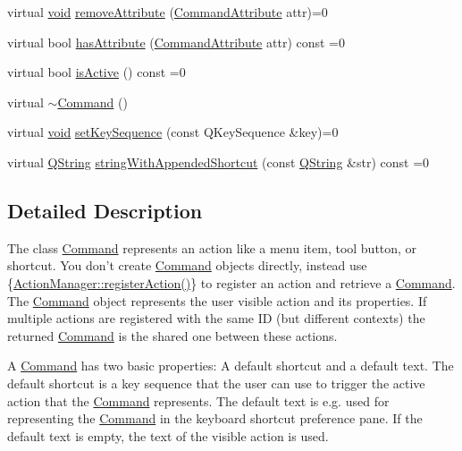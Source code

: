 \begin{DoxyCompactItemize}
\item 
virtual \hyperlink{group___u_a_v_objects_plugin_ga444cf2ff3f0ecbe028adce838d373f5c}{void} \hyperlink{group___core_plugin_ga8d243f6cf311114107abfeea80a99ad0}{remove\-Attribute} (\hyperlink{group___core_plugin_ga4d899c1f711159a432afeab3eb78c917}{Command\-Attribute} attr)=0
\item 
virtual bool \hyperlink{group___core_plugin_ga534d642231f8e08b2641744553f42def}{has\-Attribute} (\hyperlink{group___core_plugin_ga4d899c1f711159a432afeab3eb78c917}{Command\-Attribute} attr) const =0
\item 
virtual bool \hyperlink{group___core_plugin_ga1bd3d8bc9629dfcc6fc495a61b279a7c}{is\-Active} () const =0
\item 
virtual \hyperlink{group___core_plugin_gab552bb3a07fdd1acbfd8ea76e69b2278}{$\sim$\-Command} ()
\item 
virtual \hyperlink{group___u_a_v_objects_plugin_ga444cf2ff3f0ecbe028adce838d373f5c}{void} \hyperlink{group___core_plugin_gad53cfa78788d0ccaeb168c512bb2c48a}{set\-Key\-Sequence} (const Q\-Key\-Sequence \&key)=0
\item 
virtual \hyperlink{group___u_a_v_objects_plugin_gab9d252f49c333c94a72f97ce3105a32d}{Q\-String} \hyperlink{group___core_plugin_gaf1df828641589d3db881d84c471abb3f}{string\-With\-Appended\-Shortcut} (const \hyperlink{group___u_a_v_objects_plugin_gab9d252f49c333c94a72f97ce3105a32d}{Q\-String} \&str) const =0
\end{DoxyCompactItemize}


\subsection{Detailed Description}
The class \hyperlink{class_core_1_1_command}{Command} represents an action like a menu item, tool button, or shortcut. You don't create \hyperlink{class_core_1_1_command}{Command} objects directly, instead use \{\hyperlink{group___core_plugin_ga316dd0cff29b294cd1b0631677f6357d}{Action\-Manager\-::register\-Action()}\} to register an action and retrieve a \hyperlink{class_core_1_1_command}{Command}. The \hyperlink{class_core_1_1_command}{Command} object represents the user visible action and its properties. If multiple actions are registered with the same I\-D (but different contexts) the returned \hyperlink{class_core_1_1_command}{Command} is the shared one between these actions. 

A \hyperlink{class_core_1_1_command}{Command} has two basic properties\-: A default shortcut and a default text. The default shortcut is a key sequence that the user can use to trigger the active action that the \hyperlink{class_core_1_1_command}{Command} represents. The default text is e.\-g. used for representing the \hyperlink{class_core_1_1_command}{Command} in the keyboard shortcut preference pane. If the default text is empty, the text of the visible action is used.

